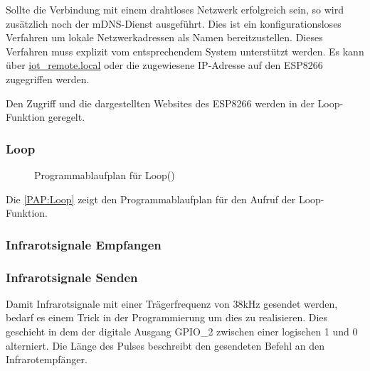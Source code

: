 Sollte die Verbindung mit einem drahtloses Netzwerk erfolgreich sein, so wird zusätzlich noch der mDNS-Dienst ausgeführt.
Dies ist ein konfigurationsloses Verfahren um lokale Netzwerkadressen als Namen bereitzustellen.
Dieses Verfahren muss explizit vom entsprechendem System unterstützt werden.
Es kann über \url{iot_remote.local} oder die zugewiesene IP-Adresse auf den ESP8266 zugegriffen werden.

Den Zugriff und die dargestellten Websites des ESP8266 werden in der Loop-Funktion geregelt.
\subsubsection{Loop}
\begin{figure}[!ht]
\centering 
{}
\caption{Programmablaufplan für Loop()}
\label{PAP:Loop}
\end{figure}

Die \autoref{PAP:Loop} zeigt den Programmablaufplan für den Aufruf der Loop-Funktion.


\subsubsection{Infrarotsignale Empfangen}
\subsubsection{Infrarotsignale Senden}
Damit Infrarotsignale mit einer Trägerfrequenz von 38kHz gesendet werden, bedarf es einem Trick in der Programmierung um dies zu realisieren.
Dies geschieht in dem der digitale Ausgang \acs{GPIO}\_2 zwischen einer logischen 1 und 0 alterniert.
Die Länge des Pulses beschreibt den gesendeten Befehl an den Infrarotempfänger.

